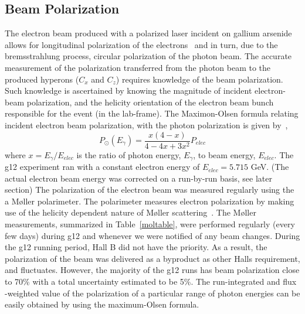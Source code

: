 \subsection{\label{sec:calib.pol}Beam Polarization}
The electron beam produced with a polarized laser incident on gallium arsenide allows for longitudinal polarization of the electrons~\cite{polarizedelectronsnew} and in turn, due to the bremsstrahlung process, circular polarization of the photon beam.  The accurate measurement of the polarization transferred from the photon beam to the produced hyperons ($C_x$ and $C_z$) requires knowledge of the beam polarization.  Such knowledge is ascertained by knowing the magnitude of incident electron-beam polarization, and the helicity orientation of the electron beam bunch responsible for the event (in the lab-frame). The Maximon-Olsen formula relating incident electron beam polarization, with the photon polarization is given by~\cite{MaximonOlsen},
\begin{equation}
P_\odot(E_\gamma) = \frac{x(4-x)}{4 - 4x + 3x^2}P_{elec}
\end{equation}
where $x = E_\gamma /E_{elec}$ is the ratio of photon energy, $E_\gamma$, to beam energy, $E_{elec}$. The g12 experiment ran with a constant electron energy of $E_{elec} = 5.715$ GeV.  (The actual electron beam energy was corrected on a run-by-run basis, see later section) The polarization of the electron beam was measured regularly using the a M{\o}ller polarimeter.  The polarimeter measures electron polarization by making use of the helicity dependent nature of M{\o}ller scattering~\cite{Mecking,Carman}. The M{\o}ller measurements, summarized in Table~\ref{moltable}, were performed regularly (every few days) during g12 and whenever we were notified of any beam changes. During the g12 running period, Hall B did not have the priority. As a result, the polarization of the beam was delivered as a byproduct as other Halls requirement, and fluctuates. However, the majority of the g12 runs has beam polarization close to 70\% with a total uncertainty estimated to be 5\%. The run-integrated and flux -weighted value of the polarization of a particular range of photon energies can be easily obtained by using the maximum-Olsen formula.

